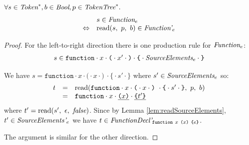 \documentclass[preprint,10pt]{sigplanconf}
\begin{document}
\begin{lemma}\mbox{}
  
  \( \forall s \in \textit{Token}^*, b \in \textit{Bool}, p \in \textit{TokenTree}^*. \)
  \[
  \begin{array}{rl}
  &s \in \textit{Function}_{e} 
  \\
  \Leftrightarrow &
  \textrm{read}(s,~p,~b) \in \textit{Function'}_{e} 
  \end{array}
  \]
\end{lemma}
\begin{proof}
  For the left-to-right direction there is one production rule for
  \( \textit{Function}_{e} \):
  \[ 
  \begin{array}{lcl}
  s \in
  \texttt{function} \cdot x \cdot \texttt{(} \cdot x' \cdot \texttt{)} \cdot
  \texttt{\{} \cdot \textit{SourceElements}_{e} \cdot \texttt{\}}
  \end{array}
  \]

 We have \( s = \texttt{function} \cdot x \cdot \texttt{(} \cdot x \cdot \texttt{)}~
 \cdot \texttt{\{} \cdot s' \cdot \texttt{\}}
 \) where \( s' \in \textit{SourceElements}_{e} \) so:
 \[
 \begin{array}{rcl}
   t &=& \textrm{read}(\texttt{function} \cdot x \cdot \texttt{(} \cdot x \cdot \texttt{)}~
   \cdot \texttt{\{} \cdot s' \cdot \texttt{\}}
   ,~p,~b)
   \\
   &=& \texttt{function} \cdot x \cdot \underline{ \texttt{(} x \texttt{)}}\cdot \underline{ \texttt{\{} t' \texttt{\}} }

 \end{array}
 \]
 where \( t' = \textrm{read}(s',~\epsilon,~\textit{false}) \). 
 Since by Lemma \ref{lem:readSourceElements},
 \( t' \in \textit{SourceElements'}_{e} \) we have \( t \in \textit{FunctionDecl'}_{\texttt{function}~x~
 \texttt{(}x \texttt{)}~
 \texttt{\{}e \texttt{\}}} \).
 
 The argument is similar for the other direction.
\end{proof}
\end{document}
